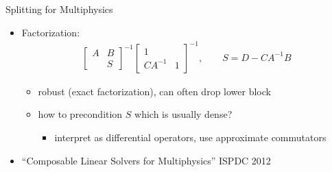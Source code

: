 \begin{frame}{Splitting for Multiphysics}
\begin{itemize}
\begin{itemize}
    \end{itemize}
  \item Factorization: 
    \begin{align*}
      \begin{bmatrix}
        A & B \\ & S
      \end{bmatrix}^{-1}
      \begin{bmatrix}
        1 & \\ CA^{-1} & 1
      \end{bmatrix}^{-1}, \qquad
      S = D - C A^{-1} B
    \end{align*}
    \begin{itemize}
    \item robust (exact factorization), can often drop lower block
    \item how to precondition $S$ which is usually dense?
      \begin{itemize}
      \item interpret as differential operators, use approximate commutators
      \end{itemize}
    \end{itemize}
  \item ``Composable Linear Solvers for Multiphysics'' ISPDC 2012
  \end{itemize}
\end{frame}
